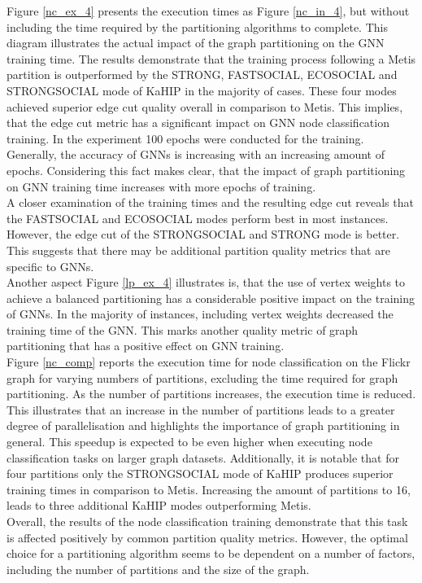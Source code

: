 \documentclass[acmsmall,nonacm,screen,review]{acmart}
\begin{document}
Figure \ref{nc_ex_4} presents the execution times as Figure \ref{nc_in_4}, but without including the time required by the partitioning algorithms to complete. This diagram illustrates the actual impact of the graph partitioning on the GNN training time. The results demonstrate that the training process following a Metis partition is outperformed by the STRONG, FASTSOCIAL, ECOSOCIAL and STRONGSOCIAL mode of KaHIP in the majority of cases. These four modes achieved superior edge cut quality overall in comparison to Metis. This implies, that the edge cut metric has a significant impact on GNN node classification training. In the experiment 100 epochs were conducted for the training. Generally, the accuracy of GNNs is increasing with an increasing amount of epochs. Considering this fact makes clear, that the impact of graph partitioning on GNN training time increases with more epochs of training. \\
A closer examination of the training times and the resulting edge cut reveals that the FASTSOCIAL and ECOSOCIAL modes perform best in most instances. However, the edge cut of the STRONGSOCIAL and STRONG mode is better. This suggests that there may be additional partition quality metrics that are specific to GNNs.\\
Another aspect Figure \ref{lp_ex_4} illustrates is, that the use of vertex weights to achieve a balanced partitioning has a considerable positive impact on the training of GNNs. In the majority of instances, including vertex weights decreased the training time of the GNN. This marks another quality metric of graph partitioning that has a positive effect on GNN training.\\
Figure \ref{nc_comp} reports the execution time for node classification on the Flickr graph for varying numbers of partitions, excluding the time required for graph partitioning. As the number of partitions increases, the execution time is reduced. This illustrates that an increase in the number of partitions leads to a greater degree of parallelisation and highlights the importance of graph partitioning in general. This speedup is expected to be even higher when executing node classification tasks on larger graph datasets. Additionally, it is notable that for four partitions only the STRONGSOCIAL mode of KaHIP produces superior training times in comparison to Metis. Increasing the amount of partitions to 16, leads to three additional KaHIP modes outperforming Metis.\\
Overall, the results of the node classification training demonstrate that this task is affected positively by common partition quality metrics. However, the optimal choice for a partitioning algorithm seems to be dependent on a number of factors, including the number of partitions and the size of the graph.
\end{document}
